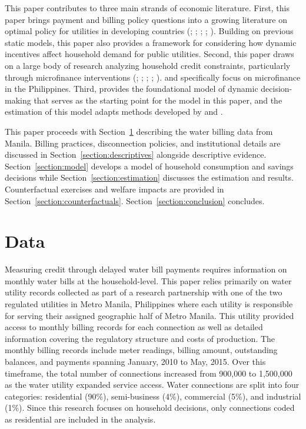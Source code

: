 \documentclass[12pt]{article}
\begin{document}
This paper contributes to three main strands of economic literature.  First, this paper brings payment and billing policy questions into a growing literature on optimal policy for utilities in developing countries (\cite{mcrae2015infrastructure}; \cite{szabo2015value}; \cite{jack2016charging}; \cite{jack2015pay}; \cite{szabo2015reducing}).  Building on previous static models, this paper also provides a framework for considering how dynamic incentives affect household demand for public utilities.  Second, this paper draws on a large body of research analyzing household credit constraints, particularly through microfinance interventions (\cite{morduch1999microfinance}; \cite{morduch1995income}; \cite{cull2009microfinance}; \cite{dupas2013savings}; \cite{jack2016borrowing}).  \cite{karlan2009expanding} and \cite{gine2014group} specifically focus on microfinance in the Philippines. Third, \cite{deaton1991saving} provides the foundational model of dynamic decision-making that serves as the starting point for the model in this paper, and the estimation of this model adapts methods developed by \cite{gourinchas2002consumption} and \cite{laibson2007estimating}.

This paper proceeds with Section~\ref{section:data} describing the water billing data from Manila.  Billing practices, disconnection policies, and institutional details are discussed in Section~\ref{section:descriptives} alongside descriptive evidence.  Section~\ref{section:model} develops a model of household consumption and savings decisions while Section~\ref{section:estimation} discusses the estimation and results.  Counterfactual exercises and welfare impacts are provided in Section~\ref{section:counterfactuals}.  Section~\ref{section:conclusion} concludes.

\section{Data}\label{section:data}


Measuring credit through delayed water bill payments requires information on monthly water bills at the household-level.  This paper relies primarily on water utility records collected as part of a research partnership with one of the two regulated utilities in Metro Manila, Philippines where each utility is responsible for serving their assigned geographic half of Metro Manila.  This utility provided access to monthly billing records for each connection as well as detailed information covering the regulatory structure and costs of production.  The monthly billing records include meter readings, billing amount, outstanding balances, and payments spanning January, 2010 to May, 2015.  Over this timeframe, the total number of connections increased from 900,000 to 1,500,000 as the water utility expanded service access.  Water connections are split into four categories: residential (90\%), semi-business (4\%), commercial (5\%), and industrial (1\%).  Since this research focuses on household decisions, only connections coded as residential are included in the analysis.  
\end{document}

